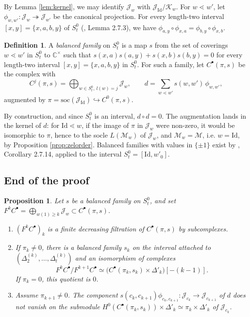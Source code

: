\documentclass[a4paper,12pt,leqno]{amsart}
\newcommand{\bbC}{\mathbb{C}}
\newcommand{\caJ}{\mathcal{J}}
\newcommand{\caK}{\mathcal{K}}
\newcommand{\caM}{\mathcal{M}}
\theoremstyle{plain}
\newtheorem{prop}[thm]{Proposition}
\theoremstyle{definition}
\newtheorem{defi}[thm]{Definition}
\theoremstyle{definition}
\newcommand{\Id}{\mathrm{Id}}
\begin{document}
By Lemma \ref{lem:kernel}, we may identify $\caJ_w$ with $\caJ_{\Id}/\caK_w$. For $w\lessdot w'$, let
$\phi_{w,w'}:\caJ_w\twoheadrightarrow\caJ_{w'}$
be the canonical projection. For every length-two interval $[x,y]=\{x,a,b,y\}$ of $S_t^0$
(\cite{BB05}, Lemma 2.7.3),
we have $\phi_{a,y}\circ\phi_{x,a}=\phi_{b,y}\circ\phi_{x,b}$.

\begin{defi} A \emph{balanced family} on $S_t^0$ is a map $s$ from the set of coverings $w\lessdot
w'$ in $S_t^0$
to $\bbC^\times$ such that $s(x,a)s(a,y)+s(x,b)s(b,y)=0$ for every length-two interval
$[x,y]=\{x,a,b,y\}$ in $S_t^0$.
For such a family, let $C^\bullet(\pi,s)$ be the complex with
\[C^j(\pi,s)=\bigoplus_{w\in S_t^0,\ l(w)=j}\caJ_w,\qquad d=\sum_{w\lessdot w'}s(w,w')\,\phi_{w,w'},\]
augmented by $\pi=\mathrm{soc}(\caJ_{\Id})\hookrightarrow C^0(\pi,s)$.
\end{defi}

By construction, and since $S_t^0$ is an interval, $d\circ d=0$. The augmentation lands in the
kernel of $d$: for $\Id\lessdot w$, if the image of $\pi$ in $\caJ_w$ were non-zero, it would be
isomorphic to $\pi$, hence to the socle $L(\caM_w)$ of $\caJ_w$, and $\caM_w=\caM$, i.e. $w=\Id$,
by Proposition \ref{prop:zelorder}. Balanced families with values in $\{\pm1\}$
exist by \cite{BB05}, Corollary 2.7.14, applied to the interval $S_t^0=[\Id,w'_0]$.

\subsection{End of the proof}

\begin{prop}\label{prop:H} Let $s$ be a balanced family on $S_t^0$, and set
$F^kC^\bullet=\bigoplus_{w(1)\geq k}\caJ_w\subset C^\bullet(\pi,s)$.
\begin{enumerate}
\item[(H1)] $(F^kC^\bullet)_k$ is a finite decreasing filtration of $C^\bullet(\pi,s)$ by subcomplexes.
\item[(H2)] If $\pi_k\neq 0$, there is a balanced family $s_k$ on the interval attached to
$(\Delta^{(k)}_2,\ldots,\Delta^{(k)}_t)$ and an isomorphism of complexes
\[F^kC^\bullet/F^{k+1}C^\bullet\simeq\big(C^\bullet(\pi_k,s_k)\times\Delta'_k\big)[-(k-1)].\]
If $\pi_k=0$, this quotient is $0$.
\item[(H3)] Assume $\pi_{k+1}\neq 0$. The component
$s(c_k,c_{k+1})\phi_{c_k,c_{k+1}}:\caJ_{c_k}\rightarrow\caJ_{c_{k+1}}$
of $d$ does not vanish on the submodule
$H^{0}(C^\bullet(\pi_k,s_k))\times\Delta'_k\simeq\pi_k\times\Delta'_k$ of $\caJ_{c_k}$.
\end{enumerate}
\end{prop}
\end{document}
